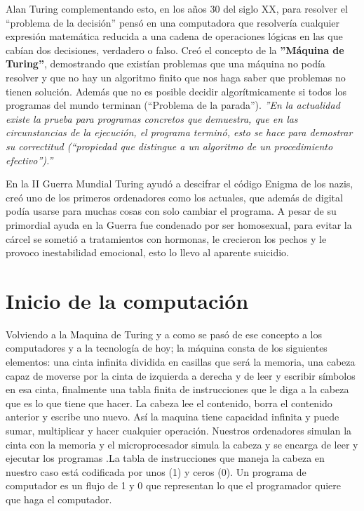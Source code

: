 ﻿\documentclass[journal,10pt,spanish]{IEEEtran}
\begin{document}
Alan Turing complementando esto, en los años 30 del siglo XX, para resolver el “problema de la decisión” pensó en una computadora que resolvería cualquier expresión matemática reducida a una cadena de operaciones lógicas en las que cabían dos decisiones, verdadero o falso. Creó el concepto de la \textbf{''Máquina de Turing''}, demostrando que existían problemas que una máquina no podía resolver y  que no hay un algoritmo finito que nos haga saber que problemas no tienen solución. Además que no es posible decidir algorítmicamente si todos los programas del mundo terminan (“Problema de la parada”). \textsl{''En la actualidad existe la prueba para programas concretos que demuestra, que en las circunstancias de la ejecución, el programa terminó, esto se hace para demostrar su correctitud (“propiedad que distingue a un algoritmo de un procedimiento efectivo”).''}

En la II Guerra Mundial Turing ayudó a descifrar el código Enigma de los nazis, creó uno de los primeros ordenadores como los actuales, que además de digital podía usarse para muchas cosas con solo cambiar el programa.  A pesar de su primordial ayuda en la Guerra fue condenado por ser homosexual, para evitar la cárcel se sometió a tratamientos con hormonas, le crecieron los pechos y le provoco inestabilidad emocional, esto lo llevo al aparente suicidio. 

\section{ Inicio de la computación}

Volviendo a la Maquina de Turing y a como se pasó de ese concepto a los computadores y a la tecnología de hoy;  la máquina consta de los siguientes elementos:  una cinta infinita dividida en casillas que será la memoria, una cabeza capaz de moverse por la cinta de izquierda a derecha y de leer y escribir símbolos en esa cinta, finalmente una tabla finita de instrucciones que le diga a la cabeza que es lo que tiene que hacer. La cabeza lee el contenido, borra el contenido anterior y escribe uno nuevo. Así la maquina tiene capacidad infinita y puede sumar, multiplicar y hacer cualquier operación. 
Nuestros ordenadores simulan la cinta con la memoria y el microprocesador simula la cabeza y se encarga de leer y ejecutar los programas \cite{sitio7}.La tabla de instrucciones que maneja la cabeza en nuestro caso está codificada por unos (1) y ceros (0). Un programa de computador es un flujo de 1 y 0 que representan lo que el programador quiere que haga el computador.
\end{document}
